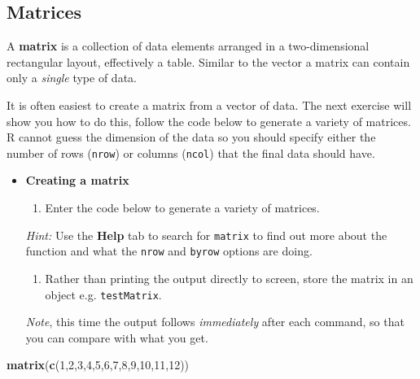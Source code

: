 \documentclass[a4paper]{book}
\newenvironment{Shaded}{\begin{snugshade}}{\end{snugshade}}
\newcommand{\KeywordTok}[1]{\textcolor[rgb]{0.13,0.29,0.53}{\textbf{{#1}}}}
\newcommand{\DecValTok}[1]{\textcolor[rgb]{0.00,0.00,0.81}{{#1}}}
\newcommand{\NormalTok}[1]{{#1}}
\providecommand{\tightlist}{%
  \setlength{\itemsep}{0pt}\setlength{\parskip}{0pt}}
\renewenvironment{Shaded}
{\vspace{1.5em}\begin{leftbar}\begin{snugshade}}
{\end{snugshade}\end{leftbar}\vspace{3pt}}
\newenvironment{rmdblock}[1]
  {\vspace{1.5em}\begin{shaded*}
  \begin{itemize}
  \renewcommand{\labelitemi}{
    \raisebox{-.7\height}[0pt][0pt]{
      {\setkeys{Gin}{width=3em,keepaspectratio}\texttt{[image: images/\#1]}}
    }
  }
  \item
  }
  {
  \end{itemize}
  \end{shaded*}
  }
\newenvironment{rmdexercise}
  {\begin{rmdblock}{exercise}}
  {\end{rmdblock}}
\begin{document}
\subsection{Matrices}\label{matrices}

A \textbf{matrix} is a collection of data elements arranged in a
two-dimensional rectangular layout, effectively a table. Similar to the
vector a matrix can contain only a \emph{single} type of data.

It is often easiest to create a matrix from a vector of data. The next
exercise will show you how to do this, follow the code below to generate
a variety of matrices. R cannot guess the dimension of the data so you
should specify either the number of rows (\texttt{nrow}) or columns
(\texttt{ncol}) that the final data should have.

\begin{rmdexercise}
\textbf{Creating a matrix}

\begin{enumerate}
\def\labelenumi{\arabic{enumi}.}
\tightlist
\item
  Enter the code below to generate a variety of matrices.
\end{enumerate}

\emph{Hint:} Use the \textbf{Help} tab to search for \texttt{matrix} to
find out more about the function and what the \texttt{nrow} and
\texttt{byrow} options are doing.

\begin{enumerate}
\def\labelenumi{\arabic{enumi}.}
\setcounter{enumi}{1}
\tightlist
\item
  Rather than printing the output directly to screen, store the matrix
  in an object e.g. \texttt{testMatrix}.
\end{enumerate}

\emph{Note}, this time the output follows \emph{immediately} after each
command, so that you can compare with what you get.
\end{rmdexercise}

\begin{Shaded}
\begin{Highlighting}[]
\KeywordTok{matrix}\NormalTok{(}\KeywordTok{c}\NormalTok{(}\DecValTok{1}\NormalTok{,}\DecValTok{2}\NormalTok{,}\DecValTok{3}\NormalTok{,}\DecValTok{4}\NormalTok{,}\DecValTok{5}\NormalTok{,}\DecValTok{6}\NormalTok{,}\DecValTok{7}\NormalTok{,}\DecValTok{8}\NormalTok{,}\DecValTok{9}\NormalTok{,}\DecValTok{10}\NormalTok{,}\DecValTok{11}\NormalTok{,}\DecValTok{12}\NormalTok{))}
\end{Highlighting}
\end{Shaded}
\end{document}
